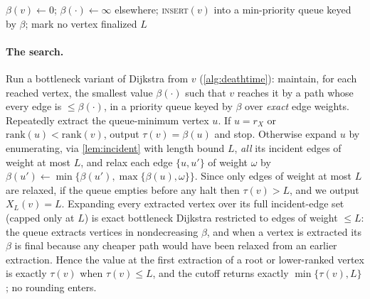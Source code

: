\begin{algorithm}[t]
\caption{Clipped death time $X_L(v)$ on the WSPD spanner $S$}\label{alg:deathtime}
$\beta(v)\leftarrow 0$; $\beta(\cdot)\leftarrow\infty$ elsewhere; \textsc{insert}$(v)$ into a min-priority queue keyed by $\beta$; mark no vertex finalized\;
\Return $L$
\end{algorithm}

\paragraph{The search.}
Run a bottleneck variant of Dijkstra from $v$ (\cref{alg:deathtime}): maintain, for each reached vertex,
the smallest value $\beta(\cdot)$ such that $v$ reaches it by a path whose every edge is $\le\beta(\cdot)$,
in a priority queue keyed by $\beta$ over \emph{exact} edge weights. Repeatedly extract the queue-minimum vertex $u$.
If $u=r_X$ or $\mathrm{rank}(u)<\mathrm{rank}(v)$, output $\tau(v)=\beta(u)$ and stop. Otherwise expand
$u$ by enumerating, via \cref{lem:incident} with length bound $L$, \emph{all} its incident edges of weight
at most $L$, and relax each edge $\{u,u'\}$ of weight $\omega$ by
$\beta(u')\leftarrow\min\{\beta(u'),\max\{\beta(u),\omega\}\}$. Since only edges of weight at most $L$ are
relaxed, if the queue empties before any halt then $\tau(v)>L$, and we output $X_L(v)=L$. Expanding every extracted vertex over its full incident-edge set
(capped only at $L$) is exact bottleneck Dijkstra restricted to edges of weight $\le L$: the queue
extracts vertices in nondecreasing $\beta$, and when a vertex is extracted its $\beta$ is final because
any cheaper path would have been relaxed from an earlier extraction. Hence the value at the first
extraction of a root or lower-ranked vertex is exactly $\tau(v)$ when $\tau(v)\le L$, and the cutoff
returns exactly $\min\{\tau(v),L\}$; no rounding enters.

